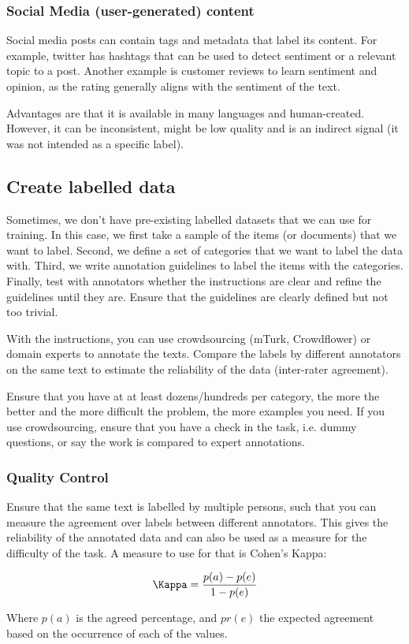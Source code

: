 \subsubsection{Social Media (user-generated) content}

Social media posts can contain tags and metadata that label its
content. For example,
twitter has hashtags that can be used to detect sentiment or a
relevant topic to a
post. Another example is customer reviews to learn sentiment and
opinion, as the rating
generally aligns with the sentiment of the text.

Advantages are that it is available in many languages and
human-created. However, it can
be inconsistent, might be low quality and is an indirect signal (it
  was not intended as
a specific label).

\subsection{Create labelled data}

Sometimes, we don't have pre-existing labelled datasets that we
can use for training. In this case, we first take a sample of
the items (or documents) that we want to label. Second, we define
a set of categories that we want to label the data with. Third, we write
annotation guidelines to label the items with the categories. Finally,
test with annotators whether the instructions are clear and refine the
guidelines until they are. Ensure that the guidelines are clearly defined
but not too trivial.

With the instructions, you can use crowdsourcing (mTurk, Crowdflower) or
domain experts to annotate the texts. Compare the labels by different 
annotators on the same text to estimate the reliability of the data 
(inter-rater agreement).

Ensure that you have at at least dozens/hundreds per category, the more the better
and the more difficult the problem, the more examples you need. If you use crowdsourcing,
ensure that you have a check in the task, i.e. dummy questions, or say the work is compared
to expert annotations.

\subsubsection{Quality Control}

Ensure that the same text is labelled by multiple persons, such that you can measure
the agreement over labels between different annotators. This gives the reliability of
the annotated data and can also be used as a measure for the difficulty of the task.
A measure to use for that is Cohen's Kappa:

\begin{definition}
  \begin{align*}
    \Kappa = \frac{p(a) - p(e)}{1 - p(e)}
  \end{align*}

  Where $p(a)$ is the agreed percentage, and $pr(e)$ the expected agreement
  based on the occurrence of each of the values.
\end{definition}


